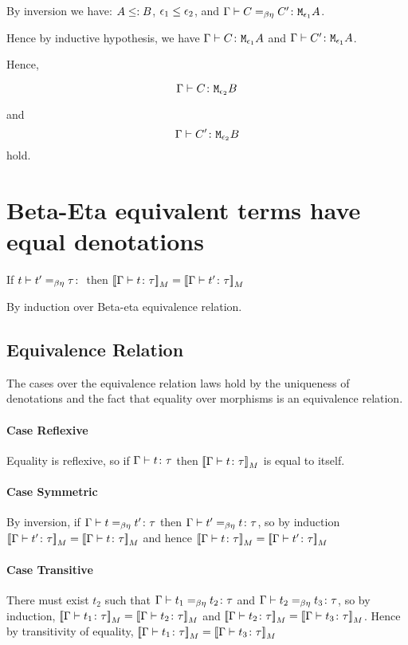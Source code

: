 \documentclass{report}
\begin{document}
    By inversion we have: $A \leq: B$, $\epsilon_1 \leq \epsilon_2$, and $\Gamma \vdash C =_{\beta\eta} C' \colon \texttt{M}_{\epsilon_1}{A}$.

    Hence by inductive hypothesis, we have $\Gamma \vdash C \colon \texttt{M}_{\epsilon_1}{A}$ and $\Gamma \vdash C' \colon \texttt{M}_{\epsilon_1}{A}$.

    Hence,

    \begin{equation}
        \Gamma \vdash C \colon \texttt{M}_{\epsilon_2}{B}
    \end{equation}

    and 
    \begin{equation}
        \Gamma \vdash C' \colon \texttt{M}_{\epsilon_2}{B}
    \end{equation}
    hold. 


    \section{Beta-Eta equivalent terms have equal denotations}
    If $\berelation{t}{t'}{\tau}$ then ${\bf [\![}\Gamma \vdash t \colon \tau{\bf ]\!]}_M = {\bf [\![}\Gamma \vdash t' \colon \tau{\bf ]\!]}_M$

    By induction over Beta-eta equivalence relation.
    \subsection{Equivalence Relation}
    The cases over the equivalence relation laws hold by the uniqueness of denotations and the fact that equality over morphisms is an equivalence relation.
    \paragraph{Case Reflexive}
    Equality is reflexive, so if $\Gamma \vdash t \colon \tau$ then ${\bf [\![}\Gamma \vdash t \colon \tau{\bf ]\!]}_M$ is equal to itself.
    \paragraph{Case Symmetric}
    By inversion, if $\Gamma \vdash t =_{\beta\eta} t' \colon \tau$ then $\Gamma \vdash t' =_{\beta\eta} t \colon \tau$, so by induction ${\bf [\![}\Gamma \vdash t' \colon \tau{\bf ]\!]}_M = {\bf [\![}\Gamma \vdash t \colon \tau{\bf ]\!]}_M$ and hence ${\bf [\![}\Gamma \vdash t \colon \tau{\bf ]\!]}_M = {\bf [\![}\Gamma \vdash t' \colon \tau{\bf ]\!]}_M$
    \paragraph{Case Transitive}
    There must exist $t_2$ such that $\Gamma \vdash t_1 =_{\beta\eta} t_2 \colon \tau$ and $\Gamma \vdash t_2 =_{\beta\eta} t_3 \colon \tau$, so by induction,
    ${\bf [\![}\Gamma \vdash t_1 \colon \tau{\bf ]\!]}_M = {\bf [\![}\Gamma \vdash t_2 \colon \tau{\bf ]\!]}_M$ and ${\bf [\![}\Gamma \vdash t_2 \colon \tau{\bf ]\!]}_M = {\bf [\![}\Gamma \vdash t_3 \colon \tau{\bf ]\!]}_M$. Hence by transitivity of equality, ${\bf [\![}\Gamma \vdash t_1 \colon \tau{\bf ]\!]}_M = {\bf [\![}\Gamma \vdash t_3 \colon \tau{\bf ]\!]}_M$
\end{document}
